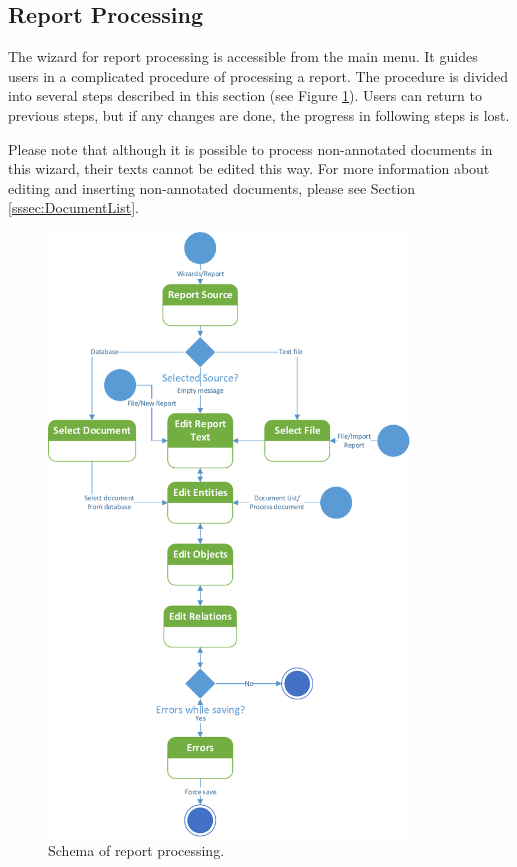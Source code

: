 \subsection{Report Processing}
\label{ssec:ProcessReport}

The wizard for report processing is accessible from the main menu. It guides
users in a complicated procedure of processing a report. The procedure is
divided into several steps described in this section (see Figure
\ref{fig:Pipeline}). Users can return to previous steps, but if any changes are
done, the progress in following steps is lost.

Please note that although it is possible to process non-annotated documents in
this wizard, their texts cannot be edited this way. For more information about
editing and inserting non-annotated documents, please see Section
\ref{sssec:DocumentList}.

\begin{figure}[!htb]
        \centering
        \includegraphics[height=16cm,keepaspectratio]{Images/pipeline}
        \caption{Schema of report processing.}
        \label{fig:Pipeline}
\end{figure}

